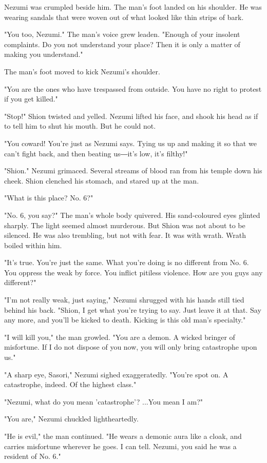 Nezumi was crumpled beside him. The man's foot landed on his shoulder.
He was wearing sandals that were woven out of what looked like thin
strips of bark.

"You too, Nezumi." The man's voice grew leaden. "Enough of your insolent
complaints. Do you not understand your place? Then it is only a matter
of making you understand."

The man's foot moved to kick Nezumi's shoulder.

"You are the ones who have trespassed from outside. You have no right to
protest if you get killed."

"Stop!" Shion twisted and yelled. Nezumi lifted his face, and shook his
head as if to tell him to shut his mouth. But he could not.

"You coward! You're just as Nezumi says. Tying us up and making it so
that we can't fight back, and then beating us―it's low, it's filthy!"

"Shion." Nezumi grimaced. Several streams of blood ran from his temple
down his cheek. Shion clenched his stomach, and stared up at the man.

"What is this place? No. 6?"

"No. 6, you say?" The man's whole body quivered. His sand-coloured eyes
glinted sharply. The light seemed almost murderous. But Shion was not
about to be silenced. He was also trembling, but not with fear. It was
with wrath. Wrath boiled within him.

"It's true. You're just the same. What you're doing is no different from
No. 6. You oppress the weak by force. You inflict pitiless violence. How
are you guys any different?"

"I'm not really weak, just saying," Nezumi shrugged with his hands still
tied behind his back. "Shion, I get what you're trying to say. Just
leave it at that. Say any more, and you'll be kicked to death. Kicking
is this old man's specialty."

"I will kill you," the man growled. "You are a demon. A wicked bringer
of misfortune. If I do not dispose of you now, you will only bring
catastrophe upon us."

"A sharp eye, Sasori," Nezumi sighed exaggeratedly. "You're spot on. A
catastrophe, indeed. Of the highest class."

"Nezumi, what do you mean 'catastrophe'? ...You mean I am?"

"You are," Nezumi chuckled lightheartedly.

"He is evil," the man continued. "He wears a demonic aura like a cloak,
and carries misfortune wherever he goes. I can tell. Nezumi, you said he
was a resident of No. 6."


